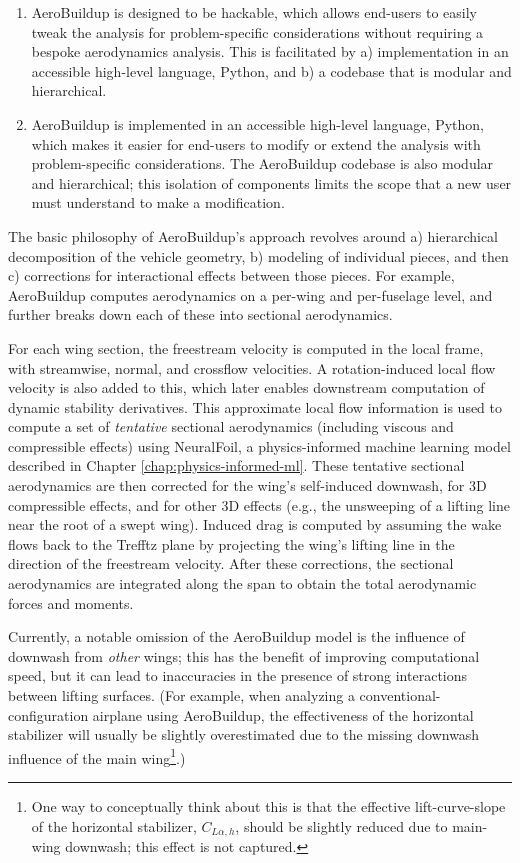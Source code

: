 \begin{enumerate}
    \item AeroBuildup is designed to be hackable, which allows end-users to easily tweak the analysis for problem-specific considerations without requiring a bespoke aerodynamics analysis. This is facilitated by a) implementation in an accessible high-level language, Python, and b) a codebase that is modular and hierarchical.

    \item AeroBuildup is implemented in an accessible high-level language, Python, which makes it easier for end-users to modify or extend the analysis with problem-specific considerations. The AeroBuildup codebase is also modular and hierarchical; this isolation of components limits the scope that a new user must understand to make a modification.

\end{enumerate}

The basic philosophy of AeroBuildup's approach revolves around a) hierarchical decomposition of the vehicle geometry, b) modeling of individual pieces, and then c) corrections for interactional effects between those pieces. For example, AeroBuildup computes aerodynamics on a per-wing and per-fuselage level, and further breaks down each of these into sectional aerodynamics.

For each wing section, the freestream velocity is computed in the local frame, with streamwise, normal, and crossflow velocities. A rotation-induced local flow velocity is also added to this, which later enables downstream computation of dynamic stability derivatives. This approximate local flow information is used to compute a set of \emph{tentative} sectional aerodynamics (including viscous and compressible effects) using NeuralFoil, a physics-informed machine learning model described in Chapter \ref{chap:physics-informed-ml}. These tentative sectional aerodynamics are then corrected for the wing's self-induced downwash, for 3D compressible effects, and for other 3D effects (e.g., the unsweeping of a lifting line near the root of a swept wing). Induced drag is computed by assuming the wake flows back to the Trefftz plane by projecting the wing's lifting line in the direction of the freestream velocity. After these corrections, the sectional aerodynamics are integrated along the span to obtain the total aerodynamic forces and moments.

Currently, a notable omission of the AeroBuildup model is the influence of downwash from \emph{other} wings; this has the benefit of improving computational speed, but it can lead to inaccuracies in the presence of strong interactions between lifting surfaces. (For example, when analyzing a conventional-configuration airplane using AeroBuildup, the effectiveness of the horizontal stabilizer will usually be slightly overestimated due to the missing downwash influence of the main wing\footnote{One way to conceptually think about this is that the effective lift-curve-slope of the horizontal stabilizer, $C_{L\alpha, h}$, should be slightly reduced due to main-wing downwash; this effect is not captured.}.)

